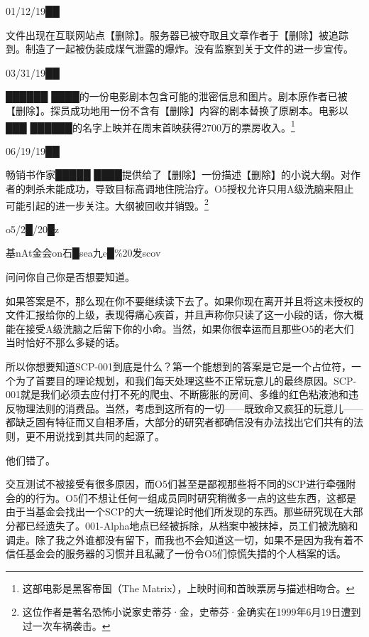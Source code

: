 \begin{scpbox}

01\slash 12\slash 19██

文件出现在互联网站点【删除】。服务器已被夺取且文章作者于【删除】被追踪到。制造了一起被伪装成煤气泄露的爆炸。没有监察到关于文件的进一步宣传。

03\slash 31\slash 19██

██████ ████的一份电影剧本包含可能的泄密信息和图片。剧本原作者已被【删除】。探员成功地用一份不含有【删除】内容的剧本替换了原剧本。电影以███ ██████的名字上映并在周末首映获得2700万的票房收入。\footnote{这部电影是黑客帝国（The Matrix），上映时间和首映票房与描述相吻合。}

06\slash 19\slash 19██

 畅销书作家█████ ████提供给了【删除】一份描述【删除】的小说大纲。对作者的刺杀未能成功，导致目标高调地住院治疗。O5授权允许只用A级洗脑来阻止可能引起的进一步关注。大纲被回收并销毁。\footnote{这位作者是著名恐怖小说家史蒂芬·金，史蒂芬·金确实在1999年6月19日遭到过一次车祸袭击。}

o5\slash 2█\slash 20█z

基nAt金会on石█sea九e█\%20发scov\\


问问你自己你是否想要知道。

如果答案是不，那么现在你不要继续读下去了。如果你现在离开并且将这未授权的文件汇报给你的上级，表现得痛心疾首，并且声称你只读了这一小段的话，你大概能在接受A级洗脑之后留下你的小命。当然，如果你很幸运而且那些O5的老大们当时恰好不那么多疑的话。

所以你想要知道SCP-001到底是什么？第一个能想到的答案是它是一个占位符，一个为了首要目的理论规划，和我们每天处理这些不正常玩意儿的最终原因。SCP-001就是我们必须去应付打不死的爬虫、不断膨胀的房间、多维的红色粘液池和违反物理法则的消费品。当然，考虑到这所有的一切——既致命又疯狂的玩意儿——都缺乏固有特征而又自相矛盾，大部分的研究者都确信没有办法找出它们共有的法则，更不用说找到其共同的起源了。

他们错了。

交互测试不被接受有很多原因，而O5们甚至是鄙视那些将不同的SCP进行牵强附会的的行为。O5们不想让任何一组成员同时研究稍微多一点的这些东西，这都是由于当基金会找出一个SCP的大一统理论时他们所发现的东西。那些研究现在大部分都已经遗失了。001-Alpha地点已经被拆除，从档案中被抹掉，员工们被洗脑和调走。除了我之外谁都没有留下，而我也不会知道这一切，如果不是因为我有着不信任基金会的服务器的习惯并且私藏了一份令O5们惊慌失措的个人档案的话。


\end{scpbox}
